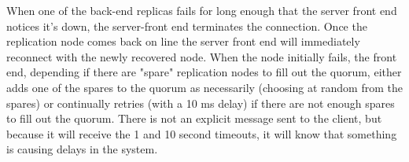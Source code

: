 \documentclass[12pt,letter]{article}
\begin{document}
\onehalfspacing
When one of the back-end replicas fails for long enough that the server front end notices it's down, the server-front end terminates the connection. Once the replication node comes back on line the server front end will immediately reconnect with the newly recovered node. When the node initially fails, the front end, depending if there are "spare" replication nodes to fill out the quorum, either adds one of the spares to the quorum as necessarily (choosing at random from the spares) or continually retries (with a 10 ms delay) if there are not enough spares to fill out the quorum. There is not an explicit message sent to the client, but because it will receive the 1 and 10 second timeouts, it will know that something is causing delays in the system.
\end{document}
